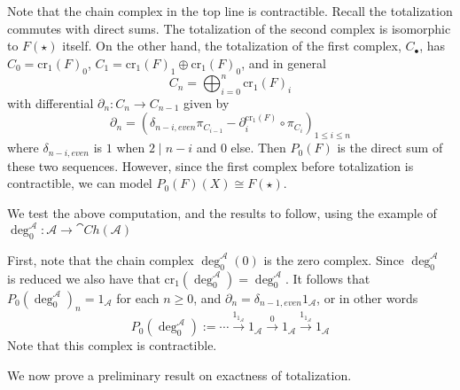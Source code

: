 Note that the chain complex in the top line is contractible. Recall the totalization commutes with direct sums. The totalization of the second complex is isomorphic to $F(\star)$ itself. On the other hand, the totalization of the first complex, $C_\bullet$, has $C_0 = \text{cr}_1(F)_0$, $C_1 = \text{cr}_1(F)_1\oplus \text{cr}_1(F)_0$, and in general
\begin{equation*}
    C_n = \bigoplus_{i=0}^n\text{cr}_1(F)_i
\end{equation*}
with differential $\partial_n:C_n\rightarrow C_{n-1}$ given by 
\begin{equation*}
    \partial_n = (\delta_{n-i,even}\pi_{C_{i-1}}-\partial_i^{\text{cr}_1(F)}\circ \pi_{C_i})_{1\leq i \leq n}
\end{equation*}
where $\delta_{n-i,even}$ is $1$ when $2\mid n-i$ and $0$ else. Then $P_0(F)$ is the direct sum of these two sequences. However, since the first complex before totalization is contractible, we can model $P_0(F)(X) \cong F(\star)$.

\begin{rmk}[label=rmk:ExplicitPn]
    
\end{rmk}

We test the above computation, and the results to follow, using the example of $\deg_0^\mathcal{A}:\mathcal{A}\rightarrow \cat{Ch}(\mathcal{A})$

\begin{eg}{}
    First, note that the chain complex $\deg_0^\mathcal{A}(0)$ is the zero complex. Since $\deg_0^\mathcal{A}$ is reduced we also have that $\text{cr}_1(\deg_0^\mathcal{A}) = \deg_0^\mathcal{A}$. It follows that $P_0(\deg_0^\mathcal{A})_n = 1_\mathcal{A}$ for each $n \geq 0$, and $\partial_n = \delta_{n-1,even}1_{\mathcal{A}}$, or in other words
    \begin{equation*}
        P_0(\deg_0^\mathcal{A}) := \cdots \xrightarrow{1_{1_\mathcal{A}}} 1_\mathcal{A}\xrightarrow{0} 1_\mathcal{A}\xrightarrow{1_{1_\mathcal{A}}} 1_\mathcal{A}
    \end{equation*}
    Note that this complex is contractible.
\end{eg}

We now prove a preliminary result on exactness of totalization.

